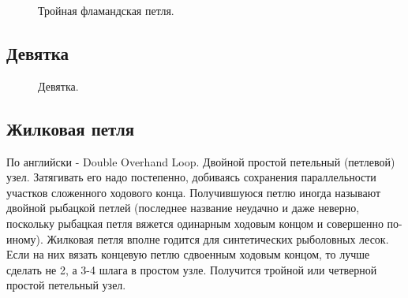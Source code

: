 \begin{figure}[H]\centering
	\begin{minipage}{1\linewidth}
		\begin{center}
			\tcbox[enhanced jigsaw,colframe=black,opacityframe=0.5,opacityback=0.5]
			{\centering{}}
		\end{center}
	\end{minipage}
\caption{Тройная фламандская петля.}
\label{ris:Triple_flemish_Loop}
\end{figure}

\subsection{Девятка}

\begin{figure}[H]\centering
	\subfloat[Завязывание]{\label{ris:Nine_1}
	\tcbox[enhanced jigsaw,colframe=black,opacityframe=0.5,opacityback=0.5]
		{\centering
			}
		}
\end{figure}

\begin{figure}[H]\centering
	\subfloat[Результат]{\label{ris:Nine_2}
	\tcbox[enhanced jigsaw,colframe=black,opacityframe=0.5,opacityback=0.5]
		{\centering
			}
		}
	\caption{Девятка.}\label{ris:Nine}
\end{figure}

\subsection{Жилковая петля}

По английски - Double Overhand Loop. Двойной простой петельный (петлевой) узел. Затягивать его надо постепенно, добиваясь сохранения параллельности участков сложенного ходового конца. Получившуюся петлю иногда называют двойной рыбацкой петлей (последнее название неудачно и даже неверно, поскольку рыбацкая петля вяжется одинарным ходовым концом и совершенно по-иному). Жилковая петля вполне годится для синтетических рыболовных лесок. Если на них вязать концевую петлю сдвоенным ходовым концом, то лучше сделать не 2, а 3-4 шлага в простом узле. Получится тройной или четверной простой петельный узел.

\begin{figure}[H]\centering
	\subfloat[Завязывание]{\label{ris:Double_Overhand_Loop_1}
	\tcbox[enhanced jigsaw,colframe=black,opacityframe=0.5,opacityback=0.5]
		{\centering
			}
		}
\end{figure}

